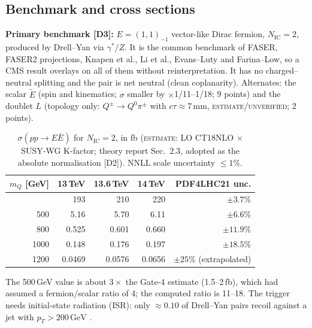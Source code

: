 \documentclass[11pt,a4paper]{article}
\newcommand{\EST}{\textsc{estimate}}
\newcommand{\UNV}{\textsc{unverified}}
\newcommand{\mQ}{m_Q}
\newcommand{\NIC}{N_{\mathrm{IC}}}
\newcommand{\GeV}{\,\mathrm{GeV}}
\begin{document}
\subsection{Benchmark and cross sections}
\textbf{Primary benchmark [D3]:} $E=(1,1)_{-1}$ vector-like Dirac fermion, $\NIC=2$, produced by Drell--Yan via $\gamma^*/Z$. It is the common benchmark of FASER, FASER2 projections, Knapen et al., Li et al., Evans--Luty and Farina--Low, so a CMS result overlays on all of them without reinterpretation. It has no charged--neutral splitting and the pair is net neutral (clean coplanarity). Alternates: the scalar $\tilde E$ (spin and kinematics; $\sigma$ smaller by $\times$1/11--1/18; 9 points) and the doublet $L$ (topology only: $Q^\pm\to Q^0\pi^\pm$ with $c\tau\approx7$\,mm, \EST/\UNV; 2 points).

{\small
\begin{longtable}{@{}rrrrr@{}}
\caption{$\sigma(pp\to E\bar E)$ for $\NIC=2$, in fb (\EST: LO CT18NLO $\times$ SUSY-WG K-factor; theory report Sec.~2.3, adopted as the absolute normalisation [D2]). NNLL scale uncertainty $\leq1\%$.}\label{tab:xsec}\\
\toprule $\mQ$ [GeV] & 13\,TeV & 13.6\,TeV & 14\,TeV & PDF4LHC21 unc.\\\midrule\endfirsthead
\bottomrule\endfoot
200 & 193 & 210 & 220 & $\pm3.7\%$\\
500 & 5.16 & 5.70 & 6.11 & $\pm6.6\%$\\
800 & 0.525 & 0.601 & 0.660 & $\pm11.9\%$\\
1000 & 0.148 & 0.176 & 0.197 & $\pm18.5\%$\\
1200 & 0.0469 & 0.0576 & 0.0656 & $\pm25\%$ (extrapolated)\\
\end{longtable}
}
The 500\,GeV value is about $3\times$ the Gate-4 estimate (1.5--2\,fb), which had assumed a fermion/scalar ratio of 4; the computed ratio is 11--18. The trigger needs initial-state radiation (ISR): only $\approx0.10$ of Drell--Yan pairs recoil against a jet with $p_T>200\GeV$ \cite{LiLi,Knapen}.
\end{document}
